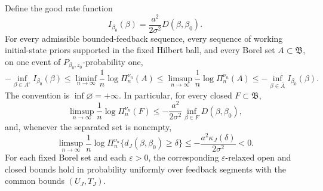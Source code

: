 \begin{theorem}
\label{thm:jacobi-rate}
Define the good rate function
\begin{equation}
 I_{\beta_0}(\beta)=\frac{a^2}{2\sigma^2}D(\beta,\beta_0).
 \label{eq:jacobi-rate-function}
\end{equation}
For every admissible bounded-feedback sequence, every sequence of working
initial-state priors supported in the fixed Hilbert ball, and every Borel set
\(A\subset\mathfrak B\), on one event of
\(P_{\beta_0,z_0}\)-probability one,
\begin{equation}
 -\inf_{\beta\in A^\circ}I_{\beta_0}(\beta)
 \le \liminf_{n\to\infty}\frac1n\log\Pi_n^{\nu_n}(A)
 \le \limsup_{n\to\infty}\frac1n\log\Pi_n^{\nu_n}(A)
 \le-\inf_{\beta\in\overline A}I_{\beta_0}(\beta).
 \label{eq:jacobi-posterior-ldp}
\end{equation}
The convention is \(\inf\varnothing=+\infty\).  In particular, for every
closed \(F\subset\mathfrak B\),
\begin{equation}
 \limsup_{n\to\infty}\frac1n\log\Pi_n^{\nu_n}(F)
 \le-\frac{a^2}{2\sigma^2}
       \inf_{\beta\in F}D(\beta,\beta_0),
 \label{eq:jacobi-closed-set-rate}
\end{equation}
and, whenever the separated set is nonempty,
\begin{equation}
 \limsup_{n\to\infty}\frac1n
 \log\Pi_n^{\nu_n}\{d_J(\beta,\beta_0)\ge\delta\}
 \le-\frac{a^2\kappa_J(\delta)}{2\sigma^2}<0.
 \label{eq:jacobi-cylinder-rate}
\end{equation}
For each fixed Borel set and each \(\varepsilon>0\), the corresponding
\(\varepsilon\)-relaxed open and closed bounds hold in probability uniformly
over feedback segments with the common bounds \((U_J,T_J)\).
\end{theorem}

